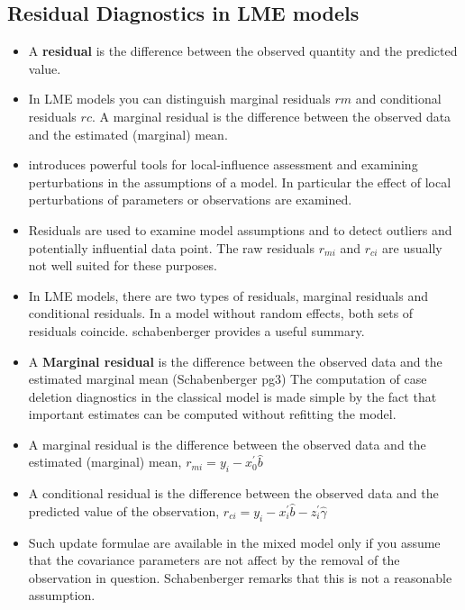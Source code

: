 \documentclass[Main.tex]{subfiles}
\begin{document}
\subsection{Residual Diagnostics in LME models}
\begin{itemize}
\item A \textbf{residual} is the difference between the observed quantity and the predicted value. 
\item In LME
models you can distinguish marginal residuals $rm$ and conditional residuals $rc$. A marginal residual is the
difference between the observed data and the estimated (marginal) mean.

\item \citet{cook86} introduces powerful tools for local-influence
assessment and examining perturbations in the assumptions of a
model. In particular the effect of local perturbations of
parameters or observations are examined.

\item Residuals are used to examine model assumptions and to detect outliers and potentially influential data
point. The raw residuals $r_{mi}$ and $r_{ci}$ are usually not well suited for these purposes.




	
\item In LME models, there are two types of residuals, marginal residuals and conditional residuals. 
In a model without random effects, both sets of residuals coincide. schabenberger provides a useful summary. 
		
\item A \textbf{Marginal residual} is the difference between the observed data and the estimated marginal mean (Schabenberger  pg3)
The computation of case deletion diagnostics in the classical model is made simple by the fact that important estimates can be computed without refitting the model. 

\item A marginal residual is the
difference between the observed data and the estimated (marginal) mean, $r_{mi} = y_i - x_0^{\prime} \hat{b}$


\item A conditional residual is the difference between the observed data and the predicted value of the observation,
$r_{ci} = y_i - x_i^{\prime} \hat{b} - z_i^{\prime} \hat{\gamma}$

	
\item Such update formulae are available in the mixed model only if you assume that the covariance parameters are not affect by the removal of the observation in question. Schabenberger remarks that this is not a reasonable assumption.
	

\end{itemize}
\end{document}
